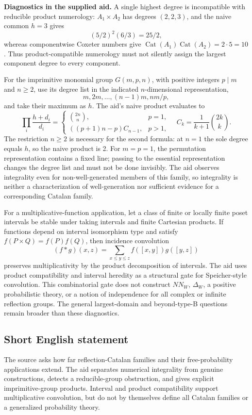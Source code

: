 \documentclass[11pt]{article}
\begin{document}
\textbf{Diagnostics in the supplied aid.} A single highest degree is incompatible with reducible product numerology: \(A_1\times A_2\) has degrees \((2,2,3)\), and the naive common \(h=3\) gives
\[
 (5/2)^2(6/3)=25/2,
\]
whereas componentwise Coxeter numbers give \(\operatorname{Cat}(A_1)\operatorname{Cat}(A_2)=2\cdot5=10\). Thus product-compatible numerology must not silently assign the largest component degree to every component.

For the imprimitive monomial group \(G(m,p,n)\), with positive integers \(p\mid m\) and \(n\ge2\), use its degree list in the indicated \(n\)-dimensional representation,
\[
 m,2m,\ldots,(n-1)m,nm/p,
\]
and take their maximum as \(h\). The aid's naive product evaluates to
\[
 \prod_i\frac{h+d_i}{d_i}
 =\begin{cases}
 \binom{2n}{n},&p=1,\\
 ((p+1)n-p)C_{n-1},&p>1,
 \end{cases}
 \quad C_k=\frac1{k+1}\binom{2k}{k}.
\]
The restriction \(n\ge2\) is necessary for the second formula: at \(n=1\) the sole degree equals \(h\), so the naive product is 2. For \(m=p=1\), the permutation representation contains a fixed line; passing to the essential representation changes the degree list and must not be done invisibly. The aid observes integrality even for non-well-generated members of this family, so integrality is neither a characterization of well-generation nor sufficient evidence for a corresponding Catalan family.

For a multiplicative-function application, let a class of finite or locally finite poset intervals be stable under taking intervals and finite Cartesian products. If functions depend on interval isomorphism type and satisfy \(f(P\times Q)=f(P)f(Q)\), then incidence convolution
\[
 (f*g)(x,z)=\sum_{x\le y\le z}f([x,y])g([y,z])
\]
preserves multiplicativity by the product decomposition of intervals. The aid uses product compatibility and interval heredity as a structural gate for Speicher-style convolution. This combinatorial gate does not construct \(NN_W\), \(\Delta_W\), a positive probabilistic theory, or a notion of independence for all complex or infinite reflection groups. The general largest-domain and beyond-type-B questions remain broader than these diagnostics.
\subsection{Short English statement}
The source asks how far reflection-Catalan families and their free-probability applications extend. The aid separates numerical integrality from genuine constructions, detects a reducible-group obstruction, and gives explicit imprimitive-group products. Interval and product compatibility support multiplicative convolution, but do not by themselves define all Catalan families or a generalized probability theory.
\end{document}
